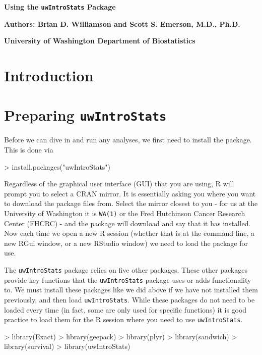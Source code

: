 \documentclass[landscape]{article}
\renewenvironment{Schunk}{\vspace{\topsep}}{\vspace{\topsep}}
\begin{document}

\centerline{\large{\textbf{Using the \texttt{uwIntroStats} Package}}}
\centerline{\textbf{Authors: Brian D. Williamson and Scott S. Emerson, M.D., Ph.D.}}
\centerline{\textbf{University of Washington Department of Biostatistics}}
\tableofcontents
\newpage
\section{Introduction}

\section{Preparing \texttt{uwIntroStats}}


\indent Before we can dive in and run any analyses, we first need to install the package. This is done via
\begin{Schunk}
\begin{Sinput}
> install.packages("uwIntroStats")
\end{Sinput}
\end{Schunk}


Regardless of the graphical user interface (GUI) that you are using, R will prompt you to select a CRAN mirror. It is essentially asking you where you want to download the package files from. Select the mirror closest to you - for us at the University of Washington it is \texttt{WA(1)} or the Fred Hutchinson Cancer Research Center (FHCRC) - and the package will download and say that it has installed. Now each time we open a new R session (whether that is at the command line, a new RGui window, or a new RStudio window) we need to load the package for use. 

The \texttt{uwIntroStats} package relies on five other packages. These other packages provide key functions that the \texttt{uwIntroStats} package uses or adds functionality to. We must install these packages like we did above if we have not installed them previously, and then load \texttt{uwIntroStats}. While these packages do not need to be loaded every time (in fact, some are only used for specific functions) it is good practice to load them for the R session where you need to use \texttt{uwIntroStats}.
\begin{Schunk}
\begin{Sinput}
> library(Exact)
> library(geepack)
> library(plyr)
> library(sandwich)
> library(survival)
> library(uwIntroStats)
\end{Sinput}
\end{Schunk}
\end{document}
